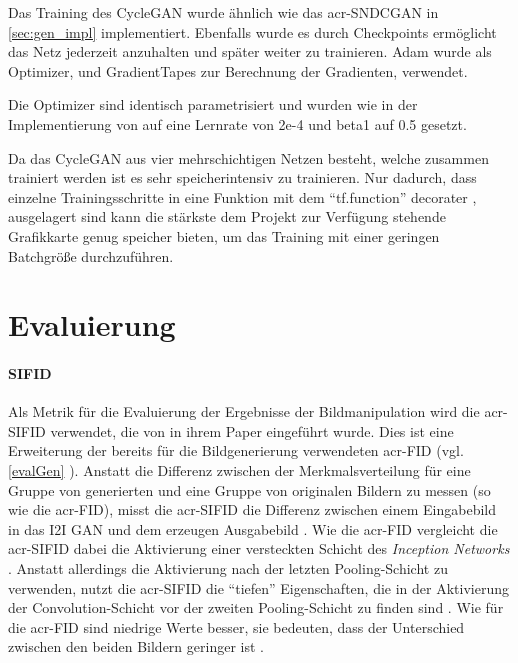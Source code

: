  Das Training des CycleGAN wurde ähnlich wie das \gls{acr-SNDCGAN} in \cref{sec:gen_impl} implementiert. Ebenfalls wurde es durch Checkpoints ermöglicht das Netz jederzeit anzuhalten und später weiter zu trainieren. Adam \cite{tf:adam} wurde als Optimizer, und GradientTapes \cite{tf:gradientape} zur Berechnung der Gradienten, verwendet.
 
Die Optimizer sind identisch parametrisiert und wurden wie in der Implementierung von \cite{brownlee_how_2019-1} auf eine Lernrate von 2e-4 und beta1 auf 0.5 gesetzt. 

Da das CycleGAN aus vier mehrschichtigen Netzen besteht, welche zusammen trainiert werden ist es sehr speicherintensiv zu trainieren. Nur dadurch, dass einzelne Trainingsschritte in eine Funktion mit dem \enquote{tf.function} decorater \cite{noauthor_tffunction_nodate}, ausgelagert sind kann die stärkste dem Projekt zur Verfügung stehende Grafikkarte genug speicher bieten, um das Training mit einer geringen Batchgröße durchzuführen. 


 \section{Evaluierung} %

 \paragraph{SIFID} Als Metrik für die Evaluierung der Ergebnisse der
 Bildmanipulation wird die \gls{acr-SIFID} verwendet, die von
 \citeauthor{shaham2019singan} in ihrem Paper 
 \cite{shaham2019singan} eingeführt wurde. Dies ist eine Erweiterung der bereits
 für die Bildgenerierung verwendeten \gls{acr-FID} \cite{heusel2017gans} (vgl.
 \cref{evalGen} %
 ). Anstatt die Differenz zwischen der Merkmalsverteilung für eine
 Gruppe von generierten und eine Gruppe von originalen Bildern zu messen (so wie
 die \gls{acr-FID}), misst die \gls{acr-SIFID} die Differenz zwischen einem
 Eingabebild in das I2I GAN und dem erzeugen Ausgabebild
 \cite[S. 4575]{shaham2019singan}. Wie die \gls{acr-FID} vergleicht die
 \gls{acr-SIFID} dabei die Aktivierung einer versteckten Schicht des
 \emph{Inception Networks} \cite{szegedy2015going}.
 Anstatt allerdings die
 Aktivierung nach der letzten Pooling-Schicht zu verwenden, nutzt die
 \gls{acr-SIFID} die \enquote{tiefen} Eigenschaften, die in der Aktivierung der
 Convolution-Schicht vor der zweiten Pooling-Schicht zu finden sind \cite[S.
 4575]{shaham2019singan}. Wie für die \gls{acr-FID} sind niedrige Werte besser,
 sie bedeuten, dass der Unterschied zwischen den beiden Bildern geringer ist
 \cite[S. 5]{pang2021image}.
